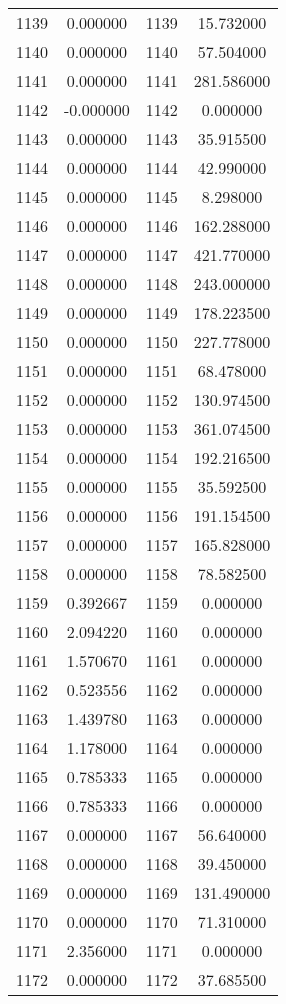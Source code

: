 \documentclass[12pt]{article}
\begin{document}
\begin{longtable}{@{}cccc@{}}
1139 & 0.000000 & 1139 & 15.732000 \\
1140 & 0.000000 & 1140 & 57.504000 \\
1141 & 0.000000 & 1141 & 281.586000 \\
1142 & -0.000000 & 1142 & 0.000000 \\
1143 & 0.000000 & 1143 & 35.915500 \\
1144 & 0.000000 & 1144 & 42.990000 \\
1145 & 0.000000 & 1145 & 8.298000 \\
1146 & 0.000000 & 1146 & 162.288000 \\
1147 & 0.000000 & 1147 & 421.770000 \\
1148 & 0.000000 & 1148 & 243.000000 \\
1149 & 0.000000 & 1149 & 178.223500 \\
1150 & 0.000000 & 1150 & 227.778000 \\
1151 & 0.000000 & 1151 & 68.478000 \\
1152 & 0.000000 & 1152 & 130.974500 \\
1153 & 0.000000 & 1153 & 361.074500 \\
1154 & 0.000000 & 1154 & 192.216500 \\
1155 & 0.000000 & 1155 & 35.592500 \\
1156 & 0.000000 & 1156 & 191.154500 \\
1157 & 0.000000 & 1157 & 165.828000 \\
1158 & 0.000000 & 1158 & 78.582500 \\
1159 & 0.392667 & 1159 & 0.000000 \\
1160 & 2.094220 & 1160 & 0.000000 \\
1161 & 1.570670 & 1161 & 0.000000 \\
1162 & 0.523556 & 1162 & 0.000000 \\
1163 & 1.439780 & 1163 & 0.000000 \\
1164 & 1.178000 & 1164 & 0.000000 \\
1165 & 0.785333 & 1165 & 0.000000 \\
1166 & 0.785333 & 1166 & 0.000000 \\
1167 & 0.000000 & 1167 & 56.640000 \\
1168 & 0.000000 & 1168 & 39.450000 \\
1169 & 0.000000 & 1169 & 131.490000 \\
1170 & 0.000000 & 1170 & 71.310000 \\
1171 & 2.356000 & 1171 & 0.000000 \\
1172 & 0.000000 & 1172 & 37.685500 \\

\end{longtable}
\end{document}
